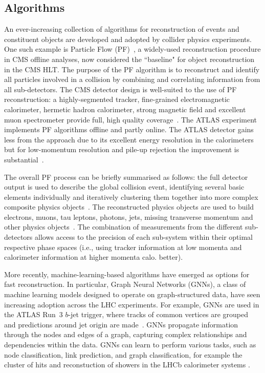 \subsection{Algorithms} \label{sec:Algorithms}

An ever-increasing collection of algorithms for reconstruction of events and constituent objects are developed and adopted by collider physics experiments. One such example is Particle Flow (PF)~\cite{sirunyan2017pflowcms}, a widely-used reconstruction procedure in CMS offline analyses, now considered the ``baseline" for object reconstruction in the CMS HLT. The purpose of the PF algorithm is to reconstruct and identify all particles involved in a collision by combining and correlating information from all sub-detectors. The CMS detector design is well-suited to the use of PF reconstruction: a highly-segmented tracker, fine-grained electromagnetic calorimeter, hermetic hadron calorimeter, strong magnetic field and excellent muon spectrometer provide full, high quality coverage~\cite{sirunyan2017pflowcms}. The ATLAS experiment implements PF algorithms offline and partly online. The ATLAS detector gains less from the approach due to its excellent energy resolution in the calorimeters but for low-momentum resolution and pile-up rejection the improvement is substantial~\cite{ATLASTriggerRun3,ATLASJetPFlow}.

The overall PF process can be briefly summarised as follows: the full detector output is used to describe the global collision event, identifying several basic elements individually and iteratively clustering them together into more complex composite physics objects~\cite{CMS:2020uim,CMS:2018rym,CMS:2014pgm}. The reconstructed physics objects are used to build electrons, muons, tau leptons, photons, jets, missing transverse momentum and other physics objects~\cite{CMS:2018jrd,CMS:2016lmd,CMS:2019ctu}. The combination of measurements from the different sub-detectors allows access to the precision of each sub-system within their optimal respective phase spaces (i.e.,  using tracker information at low momenta and calorimeter information at higher momenta calo. better).

More recently, machine-learning-based algorithms have emerged as options for fast reconstruction. In particular, Graph Neural Networks (GNNs), a class of machine learning models designed to operate on graph-structured data, have seen increasing adoption across the LHC experiments. For example, GNNs are used in the ATLAS Run~3 $b$-jet trigger, where tracks of common vertices are grouped and predictions around jet origin are made~\cite{ATLASTriggerRun3}. GNNs propagate information through the nodes and edges of a graph, capturing complex relationships and dependencies within the data. GNNs can learn to perform various tasks, such as node classification, link prediction, and graph classification, for example the cluster of hits and reconstuction of showers in the LHCb calorimeter systems \cite{canudas2022graph}.

